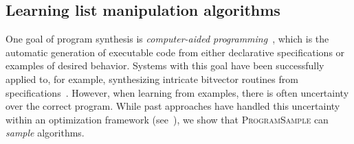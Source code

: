 \documentclass{article}
\newcommand{\theSystem}{\textsc{ProgramSample}}
\begin{document}
\subsection{Learning list manipulation algorithms}%
One goal of program synthesis is \emph{computer-aided programming}~\cite{solar2008program}, which is the automatic generation of executable code from either declarative specifications or examples of desired behavior.
Systems with this goal have been successfully applied to, for example, synthesizing intricate bitvector routines from specifications~\cite{gulwani2011automating}.
However, when learning from examples, there is often uncertainty over the correct program.
While past approaches have handled this uncertainty within an optimization framework (see~\cite{raychev2016learning,ellis2015unsupervised,singh2013automated}),
we show that \theSystem{} can \emph{sample} algorithms.
\end{document}
